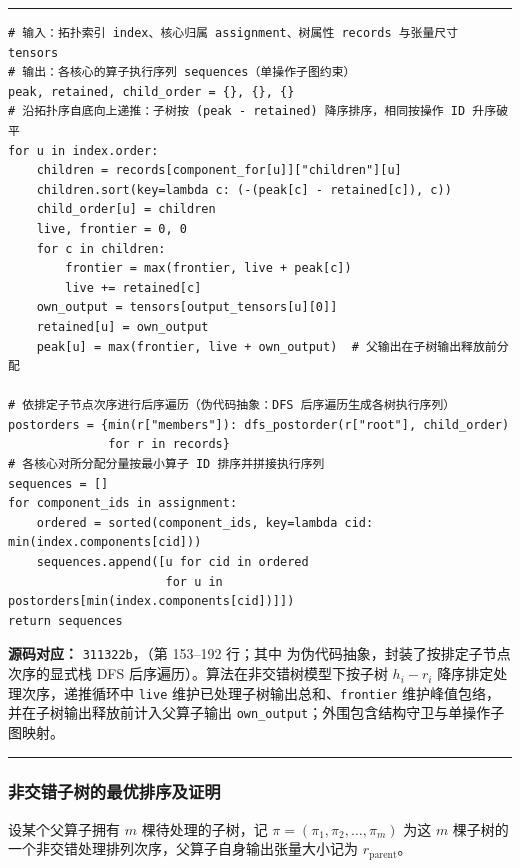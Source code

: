 \documentclass[anonymous,withtoc]{gmcm2026}
\begin{document}
\par{}\begingroup\normalsize
\captionsetup{type=algorithm,position=top,justification=raggedright,singlelinecheck=false,labelfont=bf}
\label{alg:p3-forest-memory-order}
\nopagebreak\hrule\nopagebreak


\begin{lstlisting}[style=paperpseudo]
# 输入：拓扑索引 index、核心归属 assignment、树属性 records 与张量尺寸 tensors
# 输出：各核心的算子执行序列 sequences（单操作子图约束）
peak, retained, child_order = {}, {}, {}
# 沿拓扑序自底向上递推：子树按 (peak - retained) 降序排序，相同按操作 ID 升序破平
for u in index.order:
    children = records[component_for[u]]["children"][u]
    children.sort(key=lambda c: (-(peak[c] - retained[c]), c))
    child_order[u] = children
    live, frontier = 0, 0
    for c in children:
        frontier = max(frontier, live + peak[c])
        live += retained[c]
    own_output = tensors[output_tensors[u][0]]
    retained[u] = own_output
    peak[u] = max(frontier, live + own_output)  # 父输出在子树输出释放前分配

# 依排定子节点次序进行后序遍历（伪代码抽象：DFS 后序遍历生成各树执行序列）
postorders = {min(r["members"]): dfs_postorder(r["root"], child_order)
              for r in records}
# 各核心对所分配分量按最小算子 ID 排序并拼接执行序列
sequences = []
for component_ids in assignment:
    ordered = sorted(component_ids, key=lambda cid: min(index.components[cid]))
    sequences.append([u for cid in ordered
                      for u in postorders[min(index.components[cid])]])
return sequences
\end{lstlisting}
\textbf{源码对应：} \texttt{311322b}，\texttt{}（第 153--192 行；其中 \texttt{} 为伪代码抽象，封装了按排定子节点次序的显式栈 DFS 后序遍历）。算法在非交错树模型下按子树 \(h_i - r_i\) 降序排定处理次序，递推循环中 \texttt{live} 维护已处理子树输出总和、\texttt{frontier} 维护峰值包络，并在子树输出释放前计入父算子输出 \texttt{own\_output}；外围包含结构守卫与单操作子图映射。

\par\hrule\endgroup

\subsubsection{非交错子树的最优排序及证明}

设某个父算子拥有 \(m\) 棵待处理的子树，记 \(\pi = (\pi_1, \pi_2, \dots, \pi_m)\) 为这 \(m\) 棵子树的一个非交错处理排列次序，父算子自身输出张量大小记为 \(r_{\mathrm{parent}}\)。
\end{document}
